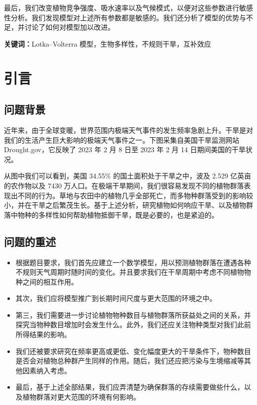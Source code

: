 \documentclass[11pt,a4paper]{ctexart}
\begin{document}
最后，我们改变植物竞争强度、吸水速率以及气候模式，以便对这些参数进行敏感性分析。我们发现模型对上述所有参数都是敏感的。我们还分析了模型的优势与不足，并讨论了如何对模型加以改进。

\vspace{6pt}
\noindent\textbf{关键词：}Lotka--Volterra 模型，生物多样性，不规则干旱，互补效应

\newpage
\pagestyle{fancy}

\section{引言}

\subsection{问题背景}

近年来，由于全球变暖，世界范围内极端天气事件的发生频率急剧上升。干旱是对我们的生活产生巨大影响的极端天气事件之一。下图采集自美国干旱监测网站 Drought.gov，它反映了 2023 年 2 月 8 日至 2023 年 2 月 14 日期间美国的干旱状况。

从图中我们可以看到，美国 34.55\% 的国土面积处于干旱之中，波及 2.529 亿英亩的农作物以及 7430 万人口。在极端干旱期间，我们很容易发现不同的植物群落表现出不同的行为。草地与农田中的植物几乎全部死亡，而多物种群落受到的影响较小，并在干旱之后繁茂生长。基于上述分析，研究植物如何响应干旱、以及植物群落中物种的多样性如何帮助植物抵御干旱，既是必要的，也是紧迫的。

\subsection{问题的重述}

\begin{itemize}
\item 根据题目要求，我们首先应建立一个数学模型，用以预测植物群落在遭遇各种不规则天气周期时随时间的变化。并且要求我们在干旱周期中考虑不同植物物种之间的相互作用。
\item 其次，我们应将模型推广到长期时间尺度与更大范围的环境之中。
\item 第三，我们需要进一步讨论植物物种数目与植物群落所获益处之间的关系，并探究当物种数目增加时会发生什么。此外，我们还应关注物种类型对我们此前所得结果的影响。
\item 我们还被要求研究在频率更高或更低、变化幅度更大的干旱条件下，物种数目是否会对植物总种群产生同样的作用。随后，我们还应把污染与生境缩减等其他因素纳入考虑。
\item 最后，基于上述全部结果，我们应弄清楚为确保群落的存续需要做些什么，以及植物群落对更大范围的环境有何影响。
\end{itemize}
\end{document}
